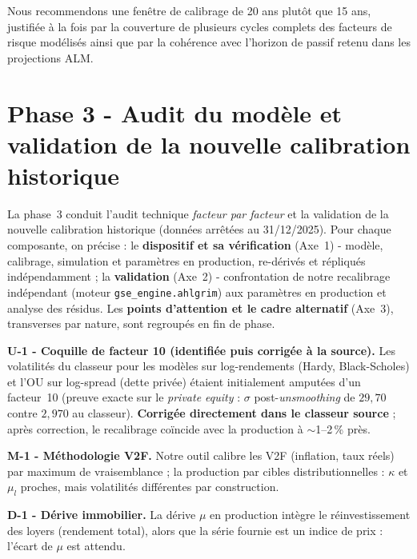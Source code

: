 \documentclass[11pt,a4paper]{article}
\begin{document}

\begin{auditbox}
Nous recommendons une fenêtre de calibrage de 20 ans plutôt que 15 ans, justifiée à la fois par la couverture de plusieurs cycles complets des facteurs de risque modélisés ainsi que par la cohérence avec l’horizon de passif retenu dans les projections ALM.
\end{auditbox}

\clearpage
\section{Phase 3 - Audit du modèle et validation de la nouvelle calibration historique}
\label{sec:phase3}

La phase~3 conduit l'audit technique \emph{facteur par facteur} et la validation de la nouvelle calibration historique (données arrêtées au 31/12/2025). Pour chaque composante, on précise : le \textbf{dispositif et sa vérification} (Axe~1) - modèle, calibrage, simulation et paramètres en production, re-dérivés et répliqués indépendamment ; la \textbf{validation} (Axe~2) - confrontation de notre recalibrage indépendant (moteur \texttt{gse\_engine.ahlgrim}) aux paramètres en production et analyse des résidus. Les \textbf{points d'attention et le cadre alternatif} (Axe~3), transverses par nature, sont regroupés en fin de phase.

\begin{insightbox}
\textbf{U-1 - Coquille de facteur 10 (identifiée puis corrigée à la source).} Les volatilités du classeur pour les modèles sur log-rendements (Hardy, Black-Scholes) et l'OU sur log-spread (dette privée) étaient initialement amputées d'un facteur~10 (preuve exacte sur le \emph{private equity} : $\sigma$ post-\emph{unsmoothing} de $29{,}70$ contre $2{,}970$ au classeur). \textbf{Corrigée directement dans le classeur source} ; après correction, le recalibrage coïncide avec la production à $\sim$1--2\,\% près.

\textbf{M-1 - Méthodologie V2F.} Notre outil calibre les V2F (inflation, taux réels) par maximum de vraisemblance ; la production par cibles distributionnelles : $\kappa$ et $\mu_l$ proches, mais volatilités différentes par construction.

\textbf{D-1 - Dérive immobilier.} La dérive $\mu$ en production intègre le réinvestissement des loyers (rendement total), alors que la série fournie est un indice de prix : l'écart de $\mu$ est attendu.
\end{insightbox}
\end{document}

